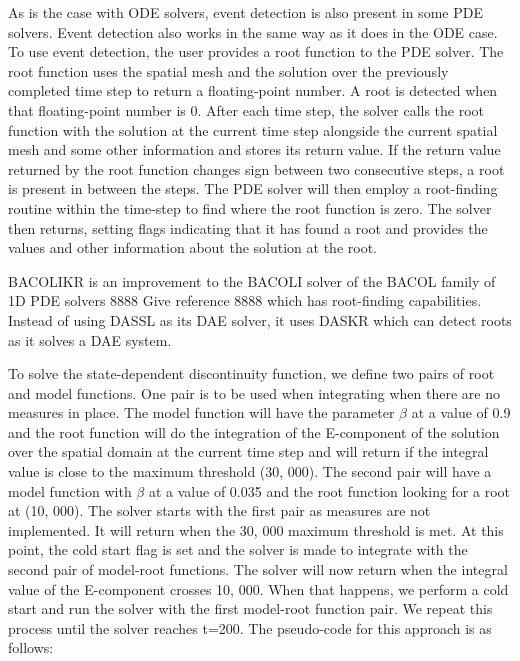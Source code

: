 \documentclass{article}
\begin{document}
As is the case with ODE solvers, event detection is also present in some PDE solvers. Event detection also works in the same way as it does in the ODE case. To use event detection, the user provides a root function to the PDE solver. The root function uses the spatial mesh and the solution over the previously completed time step to return a floating-point number. A root is detected when that floating-point number is 0. After each time step, the solver calls the root function with the solution at the current time step alongside the current spatial mesh and some other information and stores its return value. If the return value returned by the root function changes sign between two consecutive steps, a root is present in between the steps. The PDE solver will then employ a root-finding routine within the time-step to find where the root function is zero. The solver then returns, setting flags indicating that it has found a root and provides the values and other information about the solution at the root.

BACOLIKR is an improvement to the BACOLI solver of the BACOL family of 1D PDE solvers 8888 Give reference 8888 which has root-finding capabilities. Instead of using DASSL as its DAE solver, it uses DASKR which can detect roots as it solves a DAE system. 

To solve the state-dependent discontinuity function, we define two pairs of root and model functions. One pair is to be used when integrating when there are no measures in place. The model function will have the parameter $\beta$ at a value of 0.9 and the root function will do the integration of the E-component of the solution over the spatial domain at the current time step and will return if the integral value is close to the maximum threshold (30, 000). The second pair will have a model function with $\beta$ at a value of 0.035 and the root function looking for a root at (10, 000). The solver starts with the first pair as measures are not implemented. It will return when the 30, 000 maximum threshold is met. At this point, the cold start flag is set and the solver is made to integrate with the second pair of model-root functions. The solver will now return when the integral value of the E-component crosses 10, 000. When that happens, we perform a cold start and run the solver with the first model-root function pair. We repeat this process until the solver reaches t=200. The pseudo-code for this approach is as follows:
\end{document}
